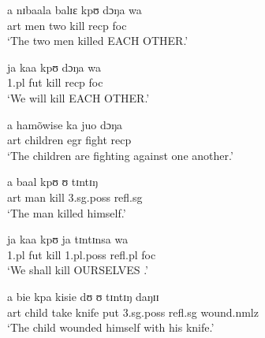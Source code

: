 
  \begin{exe}
  \ex\label{ex:GRM-recipro}
   \begin{xlist}
   
\ex\label{ex:vp24.1.}
\gll a nɪbaala balɪɛ kpʊ dɔŋa wa \\
     {\sc art} men two kill    {\sc recp}  {\sc foc} \\
\glt  `The two men killed EACH OTHER.' 

\ex\label{ex:vp24.2.}
\gll ja kaa kpʊ dɔŋa wa \\
      {\sc 1.pl} {\sc fut} kill  {\sc recp}   {\sc foc} \\
\glt  `We will kill  EACH OTHER.' 

\ex\label{ex:vp24.3.}
\gll a hamõwise ka juo dɔŋa \\
     {\sc art} children {\sc  egr} fight {\sc recp}   \\
\glt  `The children are fighting against one another.' 
 
   \end{xlist}
  \end{exe}



 \begin{exe}
        \ex\label{ex:GRM-reflex}
	\begin{xlist}
   
\ex\label{ex:vp25.1.}
\gll a baal kpʊ ʊ tɪntɪŋ \\
      {\sc art} man kill  {\sc 3.sg.poss} {\sc refl.sg} \\
\glt  `The man killed himself.' 

\ex\label{ex:vp25.2.}
\gll ja kaa kpʊ ja tɪntɪnsa wa \\
     {\sc 1.pl}  {\sc fut} kill {\sc 1.pl.poss}  {\sc refl.pl} {\sc foc} \\
\glt  `We shall kill OURSELVES	.'

\ex\label{ex:vp25.4.}
\gll a bie kpa kisie dʊ ʊ tɪntɪŋ daŋɪɪ \\
       {\sc art} child take knife put     {\sc 3.sg.poss}   {\sc
refl.sg} wound.{\sc nmlz}\\
\glt  `The child wounded himself with his knife.' 
  
   \end{xlist}
  \end{exe}





